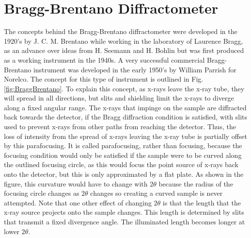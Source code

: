 \section{Bragg-Brentano Diffractometer}\label{ref:Bragg-Brentano}
The concepts behind the Bragg-Brentano diffractometer were developed in the 1920's by J. C. M. Brentano while working in the laboratory of Laurence Bragg, as an advance over ideas from H. Seemann and H. Bohlin but was first produced as a working instrument in the 1940s. A very successful commercial Bragg-Brentano instrument was developed in the early 1950's by William Parrish for Norelco. 
The concept for this type of instrument is outlined in Fig. \ref{fig:BraggBrentano}. 
To explain this concept, as x-rays leave the x-ray tube, they will spread in all directions, but slits and shielding limit the x-rays to diverge along a fixed angular range. 
The x-rays that impinge on the sample are diffracted back towards the detector, if the Bragg diffraction condition is satisfied, with slits used to prevent x-rays from other paths from reaching the detector.
Thus, the loss of intensity from the spread of x-rays leaving the x-ray tube is partially offset by this parafocusing.  
It is called parafocusing, rather than focusing, because the focusing condition would only be satisfied if the sample were to be curved along the outlined focusing circle, as this would focus the point source of x-rays back onto the detector, but this is only approximated by a flat plate. As shown in the figure, this curvature would have to change with $2\theta$ because the radius of the focusing circle changes as $2\theta$ changes so creating a curved sample is never attempted. Note that one other effect of changing $2\theta$ is that the length that the x-ray source projects onto the sample changes. This length is determined by slits that transmit a fixed divergence angle. The illuminated length becomes longer at lower $2\theta$. 

